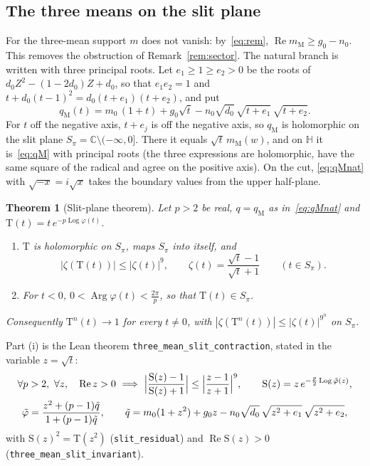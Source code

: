 \documentclass[10pt,a4paper]{article}
\theoremstyle{plain}
\newtheorem{theorem}{Theorem}[section]
\theoremstyle{remark}
\numberwithin{equation}{section}
\newcommand{\C}{\mathbb{C}}\newcommand{\R}{\mathbb{R}}\newcommand{\Hp}{\mathbb{H}}
\newcommand{\Tm}{\mathrm{T}}
\DeclareMathOperator{\re}{Re}\DeclareMathOperator{\im}{Im}
\DeclareMathOperator{\Arg}{Arg}\DeclareMathOperator{\Log}{Log}
\newcommand{\lean}[1]{\texttt{#1}}
\begin{document}
\subsection{The three means on the slit plane}\label{sec:slit}

For the three-mean support $m$ does not vanish: by~\eqref{eq:rem}, $\re m_{\mathrm M}\ge g_0-n_0$.
This removes the obstruction of Remark~\ref{rem:sector}. The natural branch is written with three
principal roots. Let $e_1\ge1\ge e_2>0$ be the roots of $d_0Z^{2}-(1-2d_0)Z+d_0$, so that
$e_1e_2=1$ and $t+d_0(t-1)^{2}=d_0(t+e_1)(t+e_2)$, and put
\begin{equation}\label{eq:qMnat}
 q_{\mathrm M}(t)=m_0\,(1+t)+g_0\sqrt t-n_0\sqrt{d_0}\,\sqrt{t+e_1}\,\sqrt{t+e_2} .
\end{equation}
For $t$ off the negative axis, $t+e_j$ is off the negative axis, so $q_{\mathrm M}$ is holomorphic on
the slit plane $S_\pi=\C\setminus(-\infty,0]$. There it equals $\sqrt t\,m_{\mathrm M}(w)$, and on
$\Hp$ it is~\eqref{eq:qM} with principal roots (the three expressions are holomorphic, have the same
square of the radical and agree on the positive axis). On the cut, \eqref{eq:qMnat} with
$\sqrt{-x}=i\sqrt x$ takes the boundary values from the upper half-plane.

\begin{theorem}[Slit-plane theorem]\label{thm:slit}
Let $p>2$ be real, $q=q_{\mathrm M}$ as in~\eqref{eq:qMnat} and $\Tm(t)=t\,e^{-p\Log\varphi(t)}$.
\begin{enumerate}
\item[(i)] $\Tm$ is holomorphic on $S_\pi$, maps $S_\pi$ into itself, and
 \[
   |\zeta(\Tm(t))|\le|\zeta(t)|^{9},\qquad \zeta(t)=\frac{\sqrt t-1}{\sqrt t+1}\qquad(t\in S_\pi).
 \]
\item[(ii)] For $t<0$, $0<\Arg\varphi(t)<\frac{2\pi}p$, so that $\Tm(t)\in S_\pi$.
\end{enumerate}
Consequently $\Tm^{n}(t)\to1$ for every $t\ne0$, with $|\zeta(\Tm^{n}(t))|\le|\zeta(t)|^{9^{n}}$ on
$S_\pi$.
\end{theorem}

Part (i) is the Lean theorem \lean{three\_mean\_slit\_contraction}, stated in the variable
$z=\sqrt t$:
\begin{gather*}
 \forall p>2,\ \forall z,\quad \re z>0\ \Longrightarrow\
 \Bigl|\frac{\mathrm S(z)-1}{\mathrm S(z)+1}\Bigr|\le\Bigl|\frac{z-1}{z+1}\Bigr|^{9},\qquad
 \mathrm S(z)=z\,e^{-\frac p2\Log\tilde\varphi(z)},\\
 \tilde\varphi=\frac{z^{2}+(p-1)\tilde q}{1+(p-1)\tilde q},\qquad
 \tilde q=m_0(1+z^{2})+g_0z-n_0\sqrt{d_0}\,\sqrt{z^{2}+e_1}\,\sqrt{z^{2}+e_2},
\end{gather*}
with $\mathrm S(z)^{2}=\Tm(z^{2})$ (\lean{slit\_residual}) and $\re\mathrm S(z)>0$
(\lean{three\_mean\_slit\_invariant}).
\end{document}
